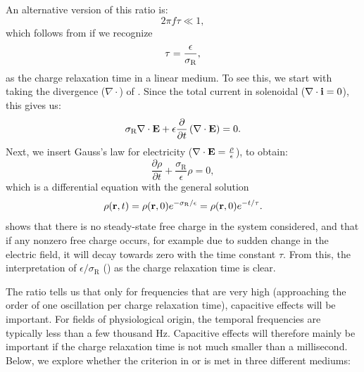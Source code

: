 An alternative version of this ratio is:
\begin{equation}
2 \pi f \tau \ll 1, 
\label{eq:Sigma:ratiocondition2}
\end{equation}
which follows from  if we recognize
\begin{equation}
\tau = \frac{\epsilon}{\sigma_\text{R}}, 
\label{eq:Sigma:chargerelaxationtime}
\index{Charge-relaxation} 
\end{equation}
as the charge relaxation time in a linear medium. To see this, we start with taking the divergence ($\nabla\cdot$) of . Since the total current in solenoidal ($\nabla\cdot{\bf i} = 0$), this gives us:
\begin{equation}
\sigma_\text{R}\nabla\cdot{\bf E} +  \epsilon \frac{\partial}{\partial t}\left(\nabla\cdot {\bf E}\right) = 0.
\label{eq:Sigma:OnTheRoadAgain}
\end{equation}
Next, we insert Gauss's law for electricity (${\bf \nabla}\cdot {\bf E} = \frac{\rho}{\epsilon}$), to obtain:
\begin{equation}
\frac{\partial \rho}{\partial t} + \frac{\sigma_\mathrm{R}}{\epsilon} \rho = 0,
\label{eq:Sigma:OhmicConcervation2}
\end{equation}
which is a differential equation with the general solution
\begin{equation}
\rho({\bf r}, t) = \rho({\bf r}, 0)e^{-\sigma_\mathrm{R}/\epsilon} = \rho({\bf r}, 0)e^{-t/\tau}.
\label{eq:Sigma:relax}
\end{equation}
 shows that there is no steady-state free charge in the system considered, 
and that if any nonzero free charge occurs, for example due to sudden change in the electric field, 
it will decay towards zero with the time constant $\tau$. 
From this, the interpretation of $\epsilon/\sigma_\mathrm{R}$ () 
as the charge relaxation time is clear. 

The ratio  tells us that only for frequencies that are very high 
(approaching the order of one oscillation per charge relaxation time), 
capacitive effects will be important. For fields of physiological origin, 
the temporal frequencies are typically less than a few thousand \si{\hertz}. 
Capacitive effects will therefore mainly be important if the charge relaxation time is not much smaller than a millisecond. 
Below, we explore whether the criterion in  or  is met 
in three different mediums:

